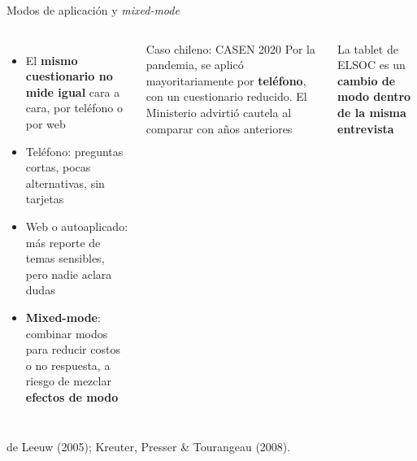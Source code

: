 \documentclass[aspectratio=169,11pt]{beamer}
\newcommand{\hl}[1]{\textcolor{marino}{\textbf{#1}}}        %
\newcommand{\fuente}[1]{\par\vfill{\scriptsize\color{gris}#1\par}}
\begin{document}
\begin{frame}{Modos de aplicación y \textit{mixed-mode}}
\begin{columns}[c]
\begin{itemize}
  \item El \textbf{mismo cuestionario no mide igual} cara a cara, por teléfono o por web
  \item Teléfono: preguntas cortas, pocas alternativas, sin tarjetas
  \item Web o autoaplicado: más reporte de temas sensibles, pero nadie aclara dudas
  \item \hl{Mixed-mode}: combinar modos para reducir costos o no respuesta, a riesgo de mezclar \textbf{efectos de modo}
\end{itemize}
\begin{exampleblock}{Caso chileno: CASEN 2020}
\small
Por la pandemia, se aplicó mayoritariamente por \textbf{teléfono}, con un cuestionario reducido. El Ministerio advirtió cautela al comparar con años anteriores
\end{exampleblock}
\bigskip
\footnotesize La tablet de ELSOC es un \textbf{cambio de modo dentro de la misma entrevista}
\end{columns}
\fuente{de Leeuw (2005); Kreuter, Presser \& Tourangeau (2008).}
\end{frame}
\end{document}
